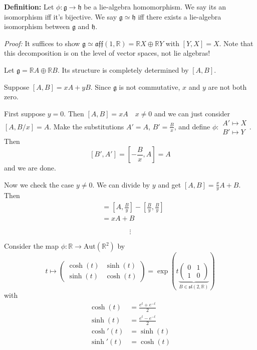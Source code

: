 \documentclass[12pt]{article}
\newcommand{\R}{\mathbb{R}}
\newcommand{\g}{\mathfrak{g}}
\newcommand{\h}{\mathfrak{h}}
\renewcommand{\sl}{\mathfrak{sl}}
\newcommand{\Aut}{\text{Aut}}
\newenvironment*{tbox}[2][gray]{
    \begin{tcolorbox}[
        parbox=false,
        colback=#1!5!white,
        colframe=#1!75!black,
        breakable,
        title={#2}
    ]}
    {\end{tcolorbox}}
\begin{document}
    \textbf{Definition:} Let $\phi: \g \to \h$ be a lie-algebra homomorphism. We say its an isomorphism iff it's bijective. We say $\g \simeq \h$ iff there exists a lie-algebra isomorphism between $\g$ and $\h$.

    \begin{tbox}{\textbf{Claim:} Let $\g$ and $\h$ be non-commutative, 2-dimensional lie-algebras. Then $\g \simeq \h$.}
        \emph{Proof:} It suffices to show $\g \simeq \mathfrak{aff}(1, \R) = \R X \oplus \R Y$ with $[Y, X] = X$. Note that this decomposition is on the level of vector spaces, not lie algebras!

        Let $\g = \R A \oplus \R B$. Its structure is completely determined by $[A, B]$. 
        
        Suppose $[A, B] = xA + yB$. Since $\g$ is not commutative, $x$ and $y$ are not both zero. 
        
        First suppose $y = 0$. Then $[A, B] = xA \quad x \neq 0$ and we can just consider $[A, B/x] = A$. Make the substitutions $A' = A$, $B' = \frac{B}{x}$, and define $\phi: \begin{array}{c}  A' \mapsto X\\ B' \mapsto Y\end{array}$. Then 
        \[[B', A'] = [-\frac{B}{x}, A] = A\]
        and we are done. 
        
        Now we check the case $y \neq 0$. We can divide by $y$ and get $[A, B] = \frac{x}{y} A + B$. Then 
        \begin{align*}
            [A - \frac{B}{y}, \frac{B}{y}] &= [A, \frac{B}{y}] - [\frac{B}{y}, \frac{B}{y}]\\
            &= xA + B
        \end{align*}

        \[\vdots\]
    \end{tbox}

    Consider the map $\phi: \R \to \Aut(\R^2)$ by 
    \[t \mapsto \begin{pmatrix}
        \cosh(t) & \sinh(t)\\ 
        \sinh(t) & \cosh(t)
    \end{pmatrix} = \exp(t \underbrace{\begin{pmatrix}
        0 & 1\\ 
        1 & 0
    \end{pmatrix}}_{B \in \sl(2, \R)})\] 
    with 
    \begin{align*}
        \cosh(t) &= \frac{e^t + e^{-t}}{2}\\ 
        \sinh(t) &= \frac{e^t - e^{-t}}{2}\\ 
        \cosh'(t) &= \sinh(t)\\ 
        \sinh'(t) &= \cosh(t)
    \end{align*}
\end{document}
